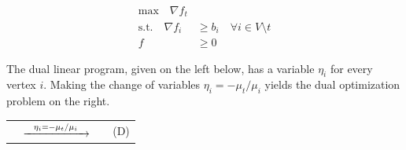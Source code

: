\documentclass[11pt]{article}
\theoremstyle{definition}
\theoremstyle{definition}
\newcommand{\R}{\mathbb{R}}
\newcommand{\gij}{\gamma_{ij}}
\begin{document}
    \begin{align*}\tag{P}
    \text{max} \quad
    \nabla f_t& \\
    \text{s.t.} \quad
    \nabla f_i &\geq b_i \quad \forall i \in V \setminus t \\
    f &\geq 0
    \end{align*}

	The dual linear program, given on the left below, has a variable $\eta_i$ for
	every vertex $i$. 
	Making the change of variables $\eta_i = - \mu_t / \mu_i$ yields the
	dual optimization problem on the right.
    \vspace{0.5cm}

	\begin{tabular}{rcll}
		\hspace*{-1.05cm}
	\resizebox{0.37\textwidth}{!}{
		\fbox{
	\begin{minipage}{0.35\textwidth}
	\begin{alignat*}{4}
    \text{min} &\quad &\sum_{i \in V \setminus t} b_i \eta_i \\
    \text{s.t.}
    &   &\gij \eta_j - \eta_i &\geq 0 \quad &&\forall\; &&(i, j) \in E \\
    &   &                     &             &&          &&\ i, j \neq t \\
    &   &\gamma_{ti} \eta_i &= -1 \quad     &&\forall\; &&(i, t) \in E \\
    &   &\eta_i &= -\gamma_{it} \quad       &&\forall\; &&(t, i) \in E \\
    &   &\eta_i &\leq 0 \quad               &&\forall\; &&i \in V \setminus t
    \end{alignat*}
	\end{minipage}
}
} & 
	$\xrightarrow{\hspace*{0.25cm}\eta_i = - \mu_t / \mu_i\hspace*{0.25cm}}$
	&
	\resizebox{0.37\textwidth}{!}{
		\fbox{
	\begin{minipage}{0.4\textwidth}
    \begin{alignat*}{3}
    \text{max} &\quad &\mu_t &\sum_{j \in V \setminus t} \frac{b_j}{\mu_j}  \\
    \text{s.t.}
    &   &\gij \mu_i &\leq \mu_j \quad &&\forall\; (i, j) \in E \\
    &   &\mu_i &\in \R_{>0} \cup \infty \quad &&\forall\; i \in V \setminus t \\
    &   &\mu_t &\in \R_{>0}
    \end{alignat*}
	\end{minipage}
}
} & \hspace*{0.4cm}(D)
\end{tabular}
\vspace{0.5cm}
\end{document}
